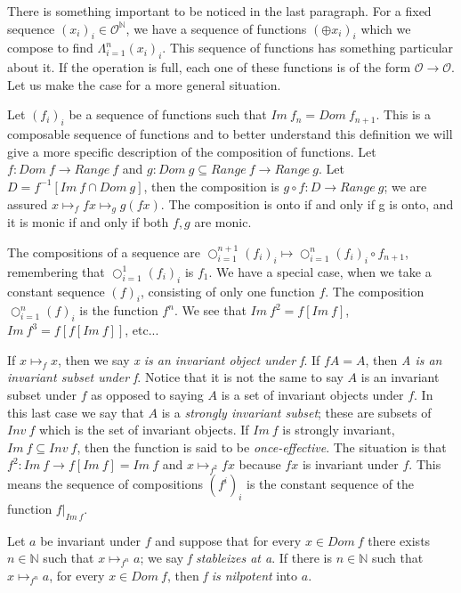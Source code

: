 \documentclass [12pt]{book}
\begin{document}
There is something important to be noticed in the last paragraph. For a fixed sequence $(x_i)_i\in\mathcal{O}^{\mathbb{N}}$, we have a sequence of functions $(\oplus x_i)_i$ which we compose to find $\Lambda_{i=1}^{n}(x_i)_i$. This sequence of functions has something particular about it. If the operation is full, each one of these functions is of the form $\mathcal{O}\rightarrow\mathcal{O}$. Let us make the case for a more general situation.

Let $(f_i)_i$ be a sequence of functions such that $Im~f_n=Dom~f_{n+1}$. This is a composable sequence of functions and to better understand this definition we will give a more specific description of the composition of functions. Let $f:Dom~f\rightarrow Range~f$ and $g:Dom~g\subseteq Range~f\rightarrow Range~g$. Let $D=f^{-1}[Im~f\cap Dom~g]$, then the composition is $g\circ f:D\rightarrow Range~g$; we are assured $x\mapsto_{f}fx\mapsto_{g}g(fx)$. The composition is onto if and only if g is onto, and it is monic if and only if both $f,g$ are monic.

The compositions of a sequence are $\bigcirc_{i=1}^{n+1}(f_i)_i\mapsto\bigcirc_{i=1}^n(f_i)_i\circ f_{n+1}$, remembering that $\bigcirc_{i=1}^1(f_i)_i$ is $f_1$. We have a special case, when we take a constant sequence $(f)_i$, consisting of only one function $f$. The composition $\bigcirc_{i=1}^n(f)_i$ is the function $f^n$. We see that $Im~f^2=f[Im~f]$, $Im~f^3=f[f[Im~f]]$, etc...

If $x\mapsto_{f}x$, then we say \textit{x is an invariant object under f}. If $fA=A$, then \textit{A is an invariant subset under f}. Notice that it is not the same to say $A$ is an invariant subset under $f$ as opposed to saying $A$ is a set of invariant objects under $f$. In this last case we say that $A$ is a \textit{strongly invariant subset}; these are subsets of $Inv~f$ which is the set of invariant objects. If $Im~f$ is strongly invariant, $Im~f\subseteq Inv~f$, then the function is said to be \textit{once-effective}. The situation is that $f^2:Im~f\rightarrow f[Im~f]=Im~f$ and $x\mapsto_{f^2}fx$ because $fx$ is invariant under $f$. This means the sequence of compositions $(f^{i})_{i}$ is the constant sequence of the function $f|_{Im~f}$.

Let $a$ be invariant under $f$ and suppose that for every $x\in Dom~f$ there exists $n\in\mathbb{N}$ such that $x\mapsto_{f^n}a$; we say \textit{f stableizes at a}. If there is $n\in\mathbb{N}$ such that $x\mapsto_{f^n}a$, for every $x\in Dom~f$, then \textit{f is nilpotent} into $a$. 
\end{document}
